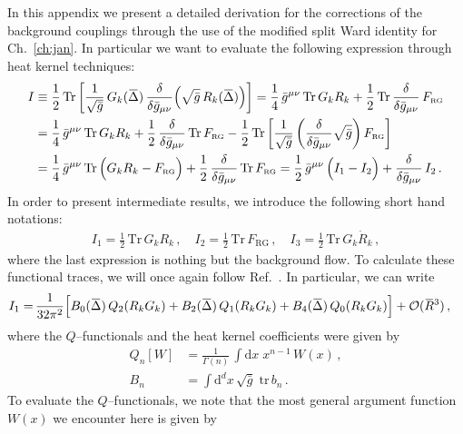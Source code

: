 \documentclass[11pt]{book}
\newcommand{\overbar}[1]{\mkern 1.5mu\overline{\mkern-1.5mu#1\mkern-1.5mu}\mkern 1.5mu}
\newcommand{\bR}{\overbar R}
\newcommand{\Tr}{\mathrm{Tr}}
\newcommand\FRG{ F_{\scriptscriptstyle{\mathrm{RG}}} }
\newcommand{\tr}{\mathrm{tr}}
\numberwithin{equation}{chapter}
\begin{document}
\begin{appendices}
In this appendix we present a detailed derivation
for the corrections of the background couplings
through the use of the modified split Ward identity for
Ch.~\ref{ch:jan}. In particular we want to evaluate
the following expression through heat kernel techniques:
\begin{align}
  I &\equiv
  \frac 12 \, \Tr
  \left[
    \frac{1}{\sqrt{\bar g}}
    \, G_k(\overbar \Delta) \, \frac{\delta}{\delta \bar g_{\mu\nu}}
    \Big( \sqrt{\bar g} \, R_k(\overbar\Delta) \Big)
  \right]
  =
  \frac 14 \, \bar g^{\mu\nu} \, \Tr \, G_k R_k
  + \frac 12 \, \Tr \, \frac{\delta}{\delta \bar g_{\mu\nu}} \, \FRG
  \nonumber \\
  &=
  \frac 14 \, \bar g^{\mu\nu} \, \Tr \, G_k R_k
  + \frac 12 \, \frac{\delta}{\delta \bar g_{\mu\nu}} \, \Tr \, \FRG
  - \frac 12 \, \Tr \,
  \bigg[
    \frac{1}{\sqrt{\bar g}}
    \left( \frac{\delta}{\delta \bar g_{\mu\nu}} \sqrt{\bar g} \right) \FRG
  \bigg]
  \nonumber \\
  &=
  \frac 14 \, \bar g^{\mu\nu} \, \Tr \, \Big( G_k R_k - \FRG \Big)
  + \frac 12 \, \frac{\delta}{\delta \bar g_{\mu\nu}} \, \Tr \, \FRG
  =
  \frac 12 \, \bar g^{\mu\nu} \, \Big( I_1 - I_2 \Big) + \frac{\delta}{\delta \bar g_{\mu\nu}} \, I_2 \,.
\end{align}
In order to present intermediate results, we introduce the following short hand notations:
\begin{align}
  I_1 = \frac 12 \, \Tr \, G_k R_k \,, \quad
  I_2 = \frac 12 \, \Tr \, \FRG \,, \quad
  I_3 = \frac 12 \, \Tr \, G_k \dot R_k \,,
\end{align}
where the last expression is nothing but the background flow.
To calculate these functional traces, we will once again follow
Ref.~\cite{Codello:2008vh}. In particular, we can write
\begin{align}
  I_1 =& \,
  \frac{1}{32 \pi^2}
  \Big[
      B_0(\overbar\Delta) \, Q_2(R_kG_k)
    + B_2(\overbar\Delta) \, Q_1(R_kG_k)
    + B_4(\overbar\Delta) \, Q_0(R_kG_k)
  \Big]
  + \mathcal O (\bR^3) \,,
\end{align}
where the $Q$--functionals and the heat kernel coefficients were given by
\begin{align}
  Q_n[W] &= \frac 1{\Gamma(n)} \, \int \mathrm dx \; x^{n-1} \, W(x) \,, \\
  B_n &= \int \mathrm d^dx \, \sqrt{\bar g} \; \tr \, b_n \,.
\end{align}
To evaluate the $Q$--functionals, we note that the most general argument function $W(x)$
we encounter here is given by

\end{appendices}
\end{document}

